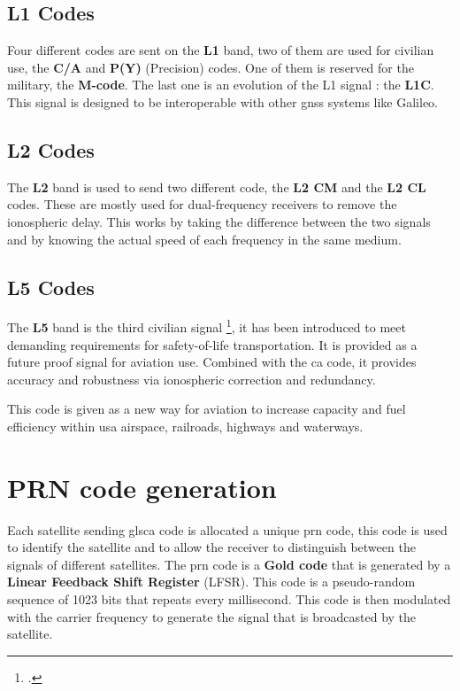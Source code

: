 \subsection{L1 Codes}

Four different codes are sent on the \textbf{L1} band, two of them are used for civilian use, the \textbf{C/A} and \textbf{P(Y)} (Precision) codes.
One of them is reserved for the military, the \textbf{M-code}.
The last one is an evolution of the L1 signal : the \textbf{L1C}. This signal is designed to be interoperable with other \gls{gnss} systems like Galileo.


\subsection{L2 Codes}

The \textbf{L2} band is used to send two different code, the \textbf{L2 CM} and the \textbf{L2 CL} codes. These are mostly used for dual-frequency receivers to remove the ionospheric delay. This works by taking the difference between the two signals and by knowing the actual speed of each frequency in the same medium.

\subsection{L5 Codes}

The \textbf{L5} band is the third civilian signal \footcite{noauthor_gps_nodate}, it has been introduced to meet demanding requirements for safety-of-life transportation. It is provided as a future proof signal for aviation use. Combined with the \gls{ca} code, it provides accuracy and robustness via ionospheric correction and redundancy.

This code is given as a new way for aviation to increase capacity and fuel efficiency within \gls{usa} airspace, railroads, highways and waterways.


\section{PRN code generation}

Each satellite sending gls{ca} code is allocated a unique \gls{prn} code, this code is used to identify the satellite and to allow the receiver to distinguish between the signals of different satellites. The \gls{prn} code is a \textbf{Gold code} that is generated by a \textbf{Linear Feedback Shift Register} (LFSR). This code is a pseudo-random sequence of 1023 bits that repeats every millisecond. This code is then modulated with the carrier frequency to generate the signal that is broadcasted by the satellite.

